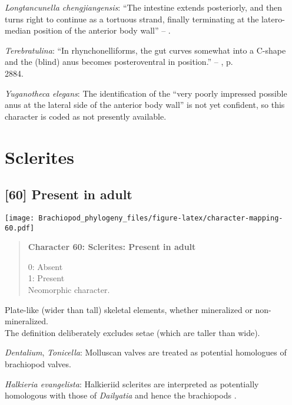 \documentclass[openany]{book}
\theoremstyle{definition}
\theoremstyle{definition}
\theoremstyle{definition}
\theoremstyle{remark}
\begin{document}
\hypertarget{Longtancunella_chengjiangensis-coding-59}{}
\emph{Longtancunella chengjiangensis}: ``The intestine extends
posteriorly, and then turns right to continue as a tortuous strand,
finally terminating at the latero-median position of the anterior body
wall'' -- \citet{Zhang2007Agregarious}.

\hypertarget{Terebratulina-coding-59}{}
\emph{Terebratulina}: ``In rhynchonelliforms, the gut curves somewhat
into a C-shape and the (blind) anus becomes posteroventral in
position.'' -- \citet{Williams2007Supplement}, p.\\
2884.

\hypertarget{Yuganotheca_elegans-coding-59}{}
\emph{Yuganotheca elegans}: The identification of the ``very poorly
impressed possible anus at the lateral side of the anterior body wall''
is not yet confident, so this character is coded as not presently
available.

\section{Sclerites}\label{sclerites}

\subsection*{{[}60{]} Present in adult}\label{present-in-adult}

\texttt{[image: Brachiopod\_phylogeny\_files/figure-latex/character-mapping-60.pdf]}

\begin{quote}
\textbf{Character 60: Sclerites: Present in adult}

0: Absent\\
1: Present\\
Neomorphic character.
\end{quote}

Plate-like (wider than tall) skeletal elements, whether mineralized or
non-mineralized.\\
The definition deliberately excludes setae (which are taller than wide).

\hypertarget{Dentalium-coding-60}{}
\emph{Dentalium}, \emph{Tonicella}: Molluscan valves are treated as
potential homologues of brachiopod valves.

\hypertarget{Halkieria_evangelista-coding-60}{}
\emph{Halkieria evangelista}: Halkieriid sclerites are interpreted as
potentially homologous with those of \emph{Dailyatia} and hence the
brachiopods \citep{Zhao2017}.
\end{document}
